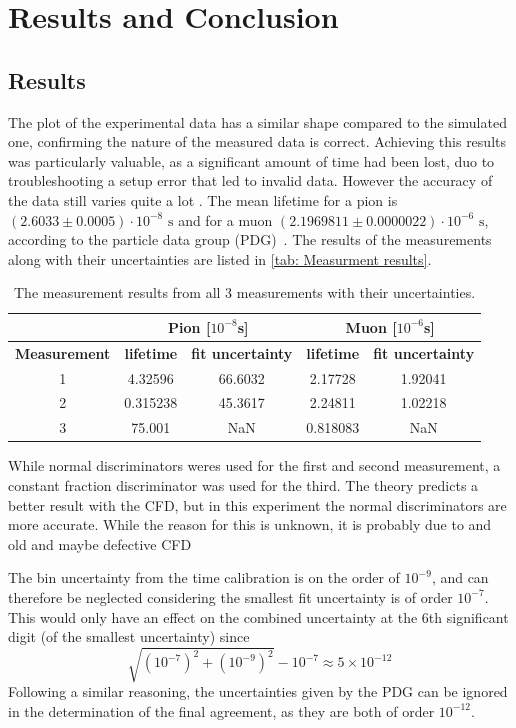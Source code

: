 \documentclass[11pt,a4paper]{article}
\begin{document}
\section{Results and Conclusion}
\subsection{Results }
The plot of the experimental data has a similar shape compared to the simulated one,
confirming the nature of the measured data is correct. Achieving this results was particularly valuable, as a significant amount of time had been lost, duo to troubleshooting a setup error that led to invalid data. However the accuracy of the data still varies quite a lot . 
The mean lifetime for a pion is $(2.6033 \pm 0.0005) \cdot 10^{-8} \text{ s}$ and for a muon $(2.1969811 \pm 0.0000022)\cdot 10^{-6} \text{ s} $, according to the particle data group (PDG)~\cite{Literature Values}. The results of the measurements along with their uncertainties are listed in \autoref{tab: Measurment results}.



\begin{table}[ht!]
\centering
\begin{tabular}{|c|c|c|c|c|}
\hline
&\multicolumn{2}{|c|}{\textbf{Pion [$10^{-8}$s]}} 
&\multicolumn{2}{|c|}{\textbf{Muon [$10^{-6}$s]}} \\
\hline
\textbf{Measurement} & \textbf{lifetime} & \textbf{fit uncertainty} & \textbf{lifetime} & \textbf{fit uncertainty}  \\
\hline
1 & 4.32596 & 66.6032  & 2.17728 & 1.92041  \\
2 & 0.315238 & 45.3617  & 2.24811 & 1.02218 \\
3 & 75.001 & NaN & 0.818083 & NaN \\
\hline
\end{tabular}
    \caption{The measurement results from all 3 measurements with their uncertainties.}
    \label{tab: Measurment results}
\end{table}

While normal discriminators weres used for the first and second measurement, a constant fraction discriminator was used for the third. The theory predicts a better result with the CFD, but in this experiment the normal discriminators are more accurate. While the reason for this is unknown, it is probably due to and old and maybe defective CFD

The bin uncertainty from the time calibration is on the order of $10^{-9}$, and can therefore be neglected considering the smallest fit uncertainty is of order $10^{-7}$. This would only have an effect on the combined uncertainty at the 6th significant digit (of the smallest uncertainty) since 
\[
\sqrt{(10^{-7})^2 + (10^{-9})^2} - 10^{-7} \approx 5 \times 10^{-12}
\]
Following a similar reasoning, the uncertainties given by the PDG can be ignored in the determination of the final agreement, as they are both of order $10^{-12}$.
\end{document}
